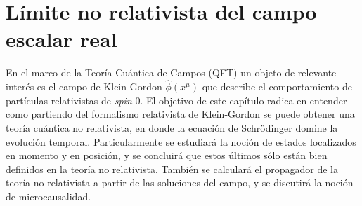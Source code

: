 \chapter{L\'imite no relativista del campo escalar real}\label{cap2}

En el marco de la Teoría Cuántica de Campos (QFT) un objeto de relevante interés es el campo de Klein-Gordon $\hat{\phi}(x^{\mu})$ que describe el comportamiento de partículas relativistas de \textit{spin} 0. El objetivo de este capítulo radica en entender como partiendo del formalismo relativista de Klein-Gordon se puede obtener una teoría cuántica no relativista, en donde la ecuación de Schr\"{o}dinger domine la evolución temporal. Particularmente se estudiará la noción de estados localizados en momento y en posición, y se concluirá que estos últimos sólo están bien definidos en la teoría no relativista. También se calculará el propagador de la teoría no relativista a partir de las soluciones del campo, y se discutirá la noción de microcausalidad.

